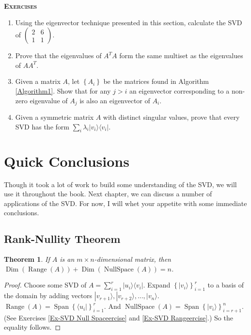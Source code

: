 \documentclass{amsbook}
\newtheorem{theorem}{Theorem}
\begin{document}
{\bfseries\scshape\Large Exercises}

\begin{enumerate}
\item Using the eigenvector technique presented in this section, calculate the SVD of $\left(\begin{array}{cc}2&6\\1&1\end{array}\right)$.
\item Prove that the eigenvalues of $A^TA$ form the same multiset as the eigenvalues of $AA^T$.
\item Given a matrix $A$, let $\left\{A_i\right\}$ be the matrices found in Algorithm \ref{Algorithm1}.  Show that for any $j>i$ an eigenvector corresponding to a non-zero eigenvalue of $A_j$ is also an eigenvector of $A_i$.
\item Given a symmetric matrix $A$ with distinct singular values, prove that every SVD has the form $\sum_i\lambda_i|v_i\rangle\langle v_i|$.
\end{enumerate}

\section{Quick Conclusions}\label{Quick Conclusions}

Though it took a lot of work to build some understanding of the SVD, we will use it throughout the book.  Next chapter, we can discuss a number of applications of the SVD.  For now, I will whet your appetite with some immediate conclusions.

\subsection{Rank-Nullity Theorem}

 \begin{theorem}
If $A$ is an $m\times n$-dimensional matrix, then $\operatorname{Dim}\left(\operatorname{Range}(A)\right)+\operatorname{Dim}\left(\operatorname{NullSpace}(A)\right)=n$.
 \end{theorem}

\begin{proof}
Choose some SVD of $A=\sum_{i=1}^r|u_i\rangle\langle v_i|$.  Expand $\left\{|v_i\rangle\right\}_{i=1}^r$ to a basis of the domain by adding vectors $|v_{r+1}\rangle, |v_{r+2}\rangle, ..., |v_n\rangle$.  $\operatorname{Range}(A)=\operatorname{Span}\left\{\langle u_i|\right\}_{i=1}^r$.  And $\operatorname{NullSpace}(A)=\operatorname{Span}\left\{|v_i\rangle\right\}_{i=r+1}^n$.  (See Exercises \ref{Ex-SVD Null Spaceercise} and \ref{Ex-SVD Rangeercise}.)  So the equality follows.
\end{proof}
\end{document}

